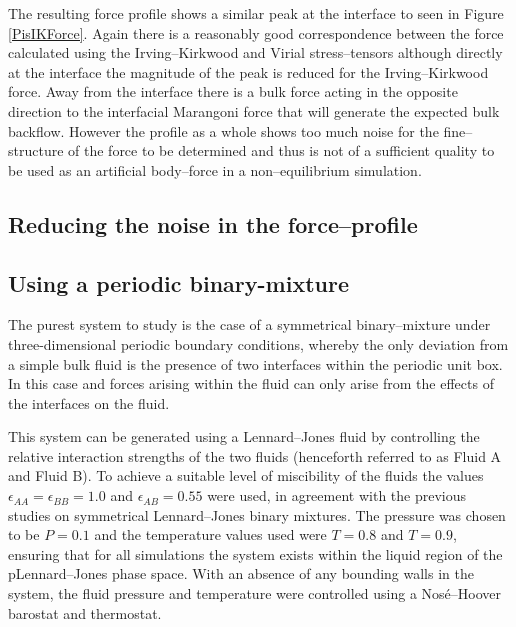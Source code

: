 The resulting force profile shows a similar peak at the interface to seen in Figure \ref{PisIKForce}.
Again there is a reasonably good correspondence between the force calculated using the Irving--Kirkwood and Virial stress--tensors although directly at the interface the magnitude of the peak is reduced for the Irving--Kirkwood force.
Away from the interface there is a bulk force acting in the opposite direction to the interfacial Marangoni force that will generate the expected bulk backflow.
However the profile as a whole shows too much noise for the fine--structure of the force to be determined and thus is not of a sufficient quality to be used as an artificial body--force in a non--equilibrium simulation.

\subsection{Reducing the noise in the force--profile}

 



\subsection{Using a periodic binary-mixture}
The purest system to study is the case of a symmetrical binary--mixture under three-dimensional periodic boundary conditions, whereby the only deviation from a simple bulk fluid is the presence of two interfaces within the periodic unit box. 
In this case and forces arising within the fluid can only arise from the effects of the interfaces on the fluid.

This system can be generated using a Lennard--Jones fluid by controlling the relative interaction strengths of the two fluids (henceforth referred to as Fluid A and Fluid B).
To achieve a suitable level of miscibility of the fluids the values $\epsilon_{AA} = \epsilon_{BB} = 1.0$ and $\epsilon_{AB}=0.55$ were used, in agreement with the previous studies on symmetrical Lennard--Jones binary mixtures.\cite{MorenzoRazo,Blas}
The pressure was chosen to be $P=0.1$ and the temperature values used were $T=0.8$ and $T=0.9$, ensuring that for all simulations the system exists within the liquid region of the pLennard--Jones phase space.\cite{Smit}
With an absence of any bounding walls in the system, the fluid pressure and temperature were controlled using a Nos\'{e}--Hoover barostat and thermostat.
